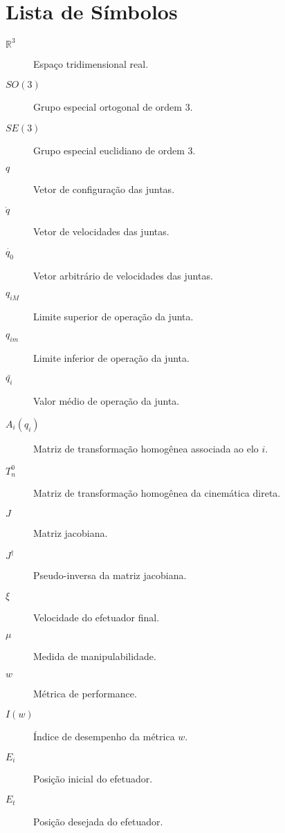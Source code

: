 \chapter*{Lista de Símbolos}

\begin{description}
    \item[$\mathbb{R}^3$] \quad Espaço tridimensional real.
    \item[$SO(3)$] \quad Grupo especial ortogonal de ordem 3.
    \item[$SE(3)$] \quad Grupo especial euclidiano de ordem 3.
    \item[$q$] \quad Vetor de configuração das juntas.
    \item[$\dot{q}$] \quad Vetor de velocidades das juntas.
    \item[$\dot{q_0}$] \quad Vetor arbitrário de velocidades das juntas.
    \item[$q_{iM}$] \quad Limite superior de operação da junta.
    \item[$q_{im}$] \quad Limite inferior de operação da junta.
    \item[$\bar{q_{i}}$] \quad Valor médio de operação da junta.
    \item[$A_i(q_i)$] \quad Matriz de transformação homogênea associada ao elo $i$.
    \item[$T^0_n$] \quad Matriz de transformação homogênea da cinemática direta.
    \item[$J$] \quad Matriz jacobiana.
    \item[$J^\dag$] \quad Pseudo-inversa da matriz jacobiana.
    \item[$\xi$] \quad Velocidade do efetuador final.
    \item[$\mu$] \quad Medida de manipulabilidade.
    \item[$w$] \quad Métrica de performance.
    \item[$I(w)$] \quad Índice de desempenho da métrica \(w\).
    \item[$E_i$] \quad Posição inicial do efetuador.
    \item[$E_t$] \quad Posição desejada do efetuador.
\end{description}

